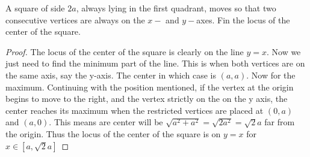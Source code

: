 \documentclass[11pt]{article}
\newenvironment{problem}[2][Problem\!]{\begin{trivlist}
\item[\hskip \labelsep {\bfseries #1}\hskip \labelsep {\bfseries #2}]}{\end{trivlist}}
\begin{document}
\newpage
\begin{tcolorbox}
    \begin{problem} {IC | 11/29 | PP15}
        A square of side $2a$, always lying in the first quadrant, moves so that two consecutive vertices are always on the $x-$ and $y-$axes. Fin the locus of the center of the square.
    \end{problem}
\end{tcolorbox}
\begin{proof}
    The locus of the center of the square is clearly on the line $y = x$. Now we just need to find the minimum part of the line. This is when both vertices are on the same axis, say the y-axis. The center in which case is $(a,a)$. Now for the maximum. Continuing with the position mentioned, if the vertex at the origin begins to move to the right, and the vertex strictly on the on the y axis, the center reaches its maximum when the restricted vertices are placed at $(0,a)$ and $(a,0)$. This means are center will be $\sqrt{a^{2} + a^{2}} = \sqrt{2a^{2}} = \sqrt{2}a$ far from the origin. Thus the locus of the center of the square is on $y=x$ for $x \in [a, \sqrt{2}a]$
\end{proof}
\end{document}
